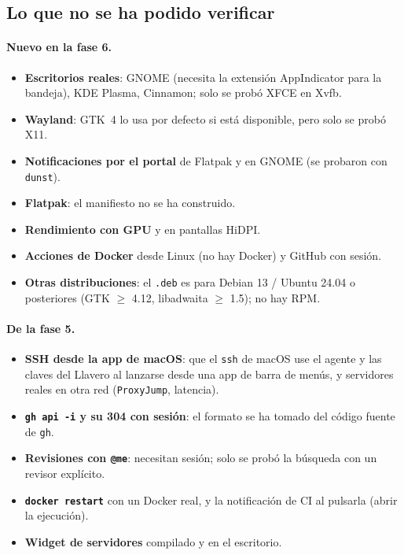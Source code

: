\documentclass[11pt,a4paper]{article}
\begin{document}
\subsection{Lo que no se ha podido verificar}
\paragraph{Nuevo en la fase 6.}
\begin{itemize}
  \item \textbf{Escritorios reales}: GNOME (necesita la extensión
    AppIndicator para la bandeja), KDE Plasma, Cinnamon; solo se
    probó XFCE en Xvfb.
  \item \textbf{Wayland}: GTK~4 lo usa por defecto si está
    disponible, pero solo se probó X11.
  \item \textbf{Notificaciones por el portal} de Flatpak y en GNOME
    (se probaron con \texttt{dunst}).
  \item \textbf{Flatpak}: el manifiesto no se ha construido.
  \item \textbf{Rendimiento con GPU} y en pantallas HiDPI.
  \item \textbf{Acciones de Docker} desde Linux (no hay Docker) y
    GitHub con sesión.
  \item \textbf{Otras distribuciones}: el \texttt{.deb} es para Debian
    13 / Ubuntu 24.04 o posteriores (GTK $\geq$ 4.12, libadwaita
    $\geq$ 1.5); no hay RPM.
\end{itemize}
\paragraph{De la fase 5.}
\begin{itemize}
  \item \textbf{SSH desde la app de macOS}: que el \texttt{ssh} de
    macOS use el agente y las claves del Llavero al lanzarse desde una
    app de barra de menús, y servidores reales en otra red
    (\texttt{ProxyJump}, latencia).
  \item \textbf{\texttt{gh api -i} y su 304 con sesión}: el formato se
    ha tomado del código fuente de \texttt{gh}.
  \item \textbf{Revisiones con \texttt{@me}}: necesitan sesión; solo
    se probó la búsqueda con un revisor explícito.
  \item \textbf{\texttt{docker restart}} con un Docker real, y la
    notificación de CI al pulsarla (abrir la ejecución).
  \item \textbf{Widget de servidores} compilado y en el escritorio.
\end{itemize}
\end{document}
